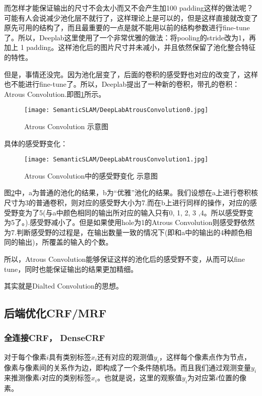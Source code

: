 而怎样才能保证输出的尺寸不会太小而又不会产生加100 padding这样的做法呢？可能有人会说减少池化层不就行了，这样理论上是可以的，但是这样直接就改变了原先可用的结构了，而且最重要的一点是就不能用以前的结构参数进行fine-tune了。所以，Deeplab这里使用了一个非常优雅的做法：将pooling的stride改为1，再加上 1 padding。这样池化后的图片尺寸并未减小，并且依然保留了池化整合特征的特性。 

但是，事情还没完。因为池化层变了，后面的卷积的感受野也对应的改变了，这样也不能进行fine-tune了。所以，Deeplab提出了一种新的卷积，带孔的卷积：Atrous Convolution.即图\ref{DeepLabAtrousConvolution0}所示。

\begin{figure}[!hbtp]
\centering
\texttt{[image: SemanticSLAM/DeepLabAtrousConvolution0.jpg]}
\caption{Atrous Convolution 示意图}
\label{DeepLabAtrousConvolution0}
\end{figure}

具体的感受野变化：

\begin{figure}[!hbtp]
\centering
\texttt{[image: SemanticSLAM/DeepLabAtrousConvolution1.jpg]}
\caption{Atrous Convolution中的感受野变化 示意图}
\label{DeepLabAtrousConvolution1}
\end{figure}

图\ref{DeepLabAtrousConvolution1}中，a为普通的池化的结果，b为“优雅”池化的结果。我们设想在a上进行卷积核尺寸为3的普通卷积，则对应的感受野大小为7.而在b上进行同样的操作，对应的感受野变为了5(与a中颜色相同的输出所对应的输入只有0, 1, 2, 3 ,4。所以感受野变为5了。).感受野减小了。但是如果使用hole为1的Atrous Convolution则感受野依然为7.判断感受野的过程是，在输出数量一致的情况下(即和a中的输出的4种颜色相同的输出)，所覆盖的输入的个数。

所以，Atrous Convolution能够保证这样的池化后的感受野不变，从而可以fine tune，同时也能保证输出的结果更加精细。

其实就是Dialted Convolution的思想。

\subsection{后端优化CRF/MRF}

\subsubsection{全连接CRF， DenseCRF}

对于每个像素$i$具有类别标签$x_i$还有对应的观测值$y_i$，这样每个像素点作为节点，像素与像素间的关系作为边，即构成了一个条件随机场。而且我们通过观测变量$y_i$来推测像素$i$对应的类别标签$x_i$。也就是说，这里的观察值$y_i$为对应第$i$位置的像素。

